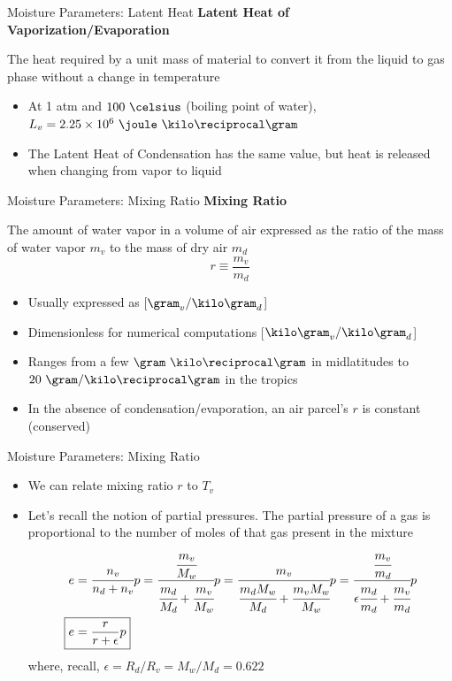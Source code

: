 
\begin{frame}{Moisture Parameters: Latent Heat}
\textbf{Latent Heat of Vaporization/Evaporation}
\begin{fancydefs}
	The heat required by a unit mass of material to convert it from the liquid to gas phase without a change in temperature
\end{fancydefs}

\begin{itemize}
	\item At 1 atm and $100\ \celsius$ (boiling point of water), $L_v = 2.25\times10^6\ \joule\ \kilo\reciprocal\gram$
	\item The Latent Heat of Condensation has the same value, but heat is released when changing from vapor to liquid
\end{itemize}
\end{frame}


\begin{frame}{Moisture Parameters: Mixing Ratio}
\textbf{Mixing Ratio}
\begin{fancydefs}
	The amount of water vapor in a volume of air expressed as the ratio of the mass of water vapor $m_v$ to the mass of dry air $m_d$
	$$r \equiv \frac{m_v}{m_d}$$
\end{fancydefs}

\begin{itemize}
	\item Usually expressed as [$\gram_v / \kilo\gram_d$]
	\item Dimensionless for numerical computations [$\kilo\gram_v / \kilo\gram_d$]
	\item Ranges from a few $\gram\ \kilo\reciprocal\gram$ in midlatitudes to $20\ \gram/\kilo\reciprocal\gram$ in the tropics
	\item In the absence of condensation/evaporation, an air parcel's $r$ is constant (conserved)
\end{itemize}
\end{frame}



\begin{frame}{Moisture Parameters: Mixing Ratio}
\begin{itemize}
	\item We can relate mixing ratio $r$ to $T_v$
	\item Let's recall the notion of partial pressures. The partial pressure of a gas is proportional to the number of moles of that gas present in the mixture
	\begin{align*}
	e &= \cfrac{n_v}{n_d + n_v}p = \cfrac{\cfrac{m_v}{M_w}}{\cfrac{m_d}{M_d} + \cfrac{m_v}{M_w}}p = \cfrac{m_v}{\cfrac{m_dM_w}{M_d} + \cfrac{m_vM_w}{M_w}}p = \cfrac{\cfrac{m_v}{m_d}}{\epsilon\cfrac{m_d}{m_d} + \cfrac{m_v}{m_d}}p\\
	\Aboxed{e&= \frac{r}{r+\epsilon}p}
	\end{align*}
	where, recall, $\epsilon = R_d/R_v = M_w/M_d = 0.622$
\end{itemize}
\end{frame}

